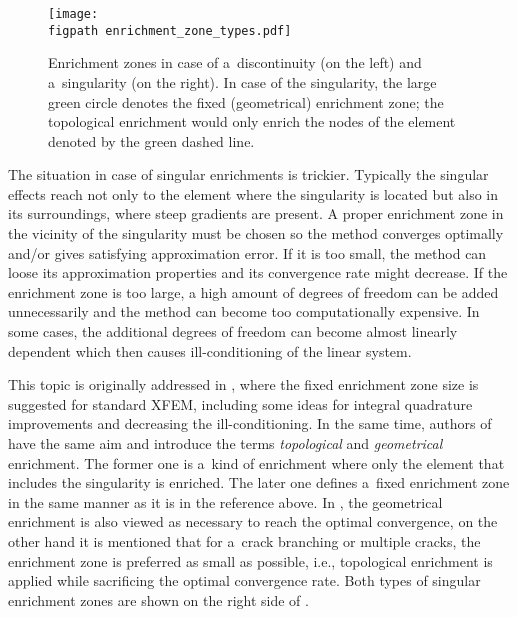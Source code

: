 \begin{figure}[!htb]
  \centering    
    \texttt{[image: \\figpath enrichment\_zone\_types.pdf]}
  \caption[Enrichment zone types.]{Enrichment zones in case of a~discontinuity (on the left) and a~singularity (on the right).
  In case of the singularity, the large green circle denotes the fixed (geometrical) enrichment zone; the topological enrichment would
  only enrich the nodes of the element denoted by the green dashed line.}
  \label{fig:enrichment_zone_types}
\end{figure}
The situation in case of singular enrichments is trickier.
Typically the singular effects reach not only to the element where the singularity is located but also in its surroundings,
where steep gradients are present.
A proper enrichment zone in the vicinity of the singularity must be chosen so the method converges optimally
and/or gives satisfying approximation error. If it is too
small, the method can loose its approximation properties and its convergence rate might decrease. If the enrichment zone is too large,
a high amount of degrees of freedom can be added unnecessarily and the method can become too computationally expensive.
In some cases, the additional degrees of freedom can become almost linearly dependent which then causes ill-conditioning of the linear system.

This topic is originally addressed in \cite{laborde_highorder_2005}, where the fixed enrichment zone size is suggested for standard XFEM,
including some ideas for integral quadrature improvements and decreasing the ill-conditioning. In the same time, authors of \cite{bechet_improved_2005}
have the same aim and introduce the terms \emph{topological} and \emph{geometrical} enrichment. The former one is a~kind of enrichment where only the element
that includes the singularity is enriched. The later one defines a~fixed enrichment zone in the same manner as it is in the reference above.
In \cite{fries_corrected_2008}, the geometrical enrichment is also viewed as necessary to reach the optimal convergence, on the other hand
it is mentioned that for a~crack branching or multiple cracks, the enrichment zone is preferred as small as possible, i.e., topological enrichment is applied
while sacrificing the optimal convergence rate.
Both types of singular enrichment zones are shown on the right side of .

